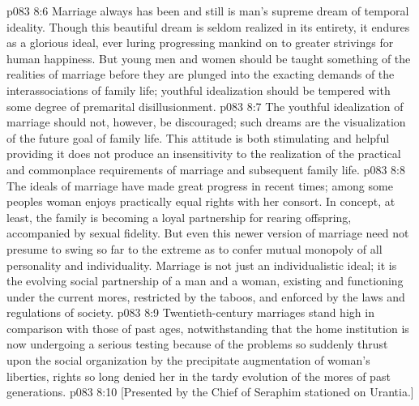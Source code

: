 \vs p083 8:6 \pc Marriage always has been and still is man’s supreme dream of temporal ideality. Though this beautiful dream is seldom realized in its entirety, it endures as a glorious ideal, ever luring progressing mankind on to greater strivings for human happiness. But young men and women should be taught something of the realities of marriage before they are plunged into the exacting demands of the interassociations of family life; youthful idealization should be tempered with some degree of premarital disillusionment.
\vs p083 8:7 The youthful idealization of marriage should not, however, be discouraged; such dreams are the visualization of the future goal of family life. This attitude is both stimulating and helpful providing it does not produce an insensitivity to the realization of the practical and commonplace requirements of marriage and subsequent family life.
\vs p083 8:8 The ideals of marriage have made great progress in recent times; among some peoples woman enjoys practically equal rights with her consort. In concept, at least, the family is becoming a loyal partnership for rearing offspring, accompanied by sexual fidelity. But even this newer version of marriage need not presume to swing so far to the extreme as to confer mutual monopoly of all personality and individuality. Marriage is not just an individualistic ideal; it is the evolving social partnership of a man and a woman, existing and functioning under the current mores, restricted by the taboos, and enforced by the laws and regulations of society.
\vs p083 8:9 Twentieth\hyp{}century marriages stand high in comparison with those of past ages, notwithstanding that the home institution is now undergoing a serious testing because of the problems so suddenly thrust upon the social organization by the precipitate augmentation of woman’s liberties, rights so long denied her in the tardy evolution of the mores of past generations.
\vsetoff
\vs p083 8:10 [Presented by the Chief of Seraphim stationed on Urantia.]
